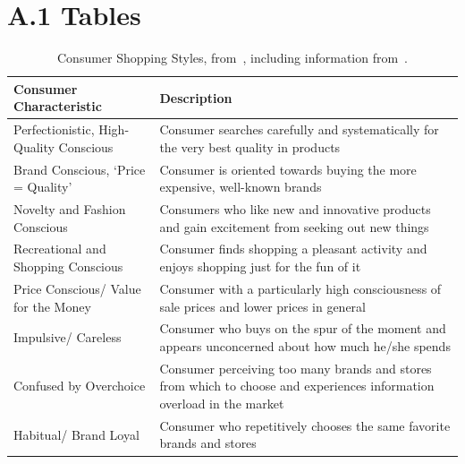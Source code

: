 \section*{A.1 Tables}

\begin{table}[ht]
	\begin{tabular}{p{} p{}}
		\toprule
		Consumer Characteristic                 & Description                                                                                                            \\\midrule
		Perfectionistic, High-Quality Conscious & Consumer searches carefully and \newline systematically for the very best quality in products                          \\
		Brand Conscious, `Price = Quality'      & Consumer is oriented towards buying the more expensive, well-known brands                                              \\
		Novelty and Fashion Conscious           & Consumers who like new and innovative products and gain excitement from seeking out new things                         \\
		Recreational and Shopping Conscious     & Consumer finds shopping a pleasant activity and enjoys shopping just for the fun of it                                 \\
		Price Conscious/ Value for the Money    & Consumer with a particularly high consciousness of sale prices and lower prices in general                             \\
		Impulsive/ Careless                     & Consumer who buys on the spur of the moment and appears unconcerned about how much he/she spends                       \\
		Confused by Overchoice                  & Consumer perceiving too many brands and stores from which to choose and experiences information overload in the market \\
		Habitual/ Brand Loyal                   & Consumer who repetitively chooses the same favorite brands and stores                                                  \\\bottomrule
	\end{tabular}\\
	\caption{Consumer Shopping Styles, from~\cite{ShoppingStyles}, including information from~\cite{ShoppingStyles2}.}\label{tab:shoppingStyles}
\end{table}

